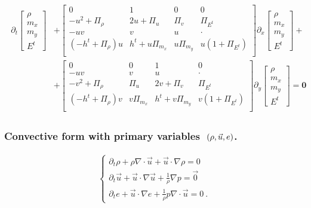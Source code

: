 \documentclass[letterpaper,10pt,english]{jupyterBook}
\begin{document}
\begin{equation}\label{equation:ch/pde/hyperbolic-nd-euler:eq:pde:hyperbolic:differential:convective:euler:cons-vars:mat}
\begin{split}\begin{aligned}
  \partial_t \begin{bmatrix} \rho \\ m_x \\ m_y \\ E^t \end{bmatrix} 
 & + \begin{bmatrix}
  0 & 1  & 0 & 0 \\
  -u^2 + \Pi_{\rho} & 2 u + \Pi_u & \Pi_v & \Pi_{E^t}  \\
  -uv    & v & u & \cdot \\
  (-h^t + \Pi_\rho ) u & h^t + u \Pi_{m_x} & u \Pi_{m_y} & u ( 1 + \Pi_{E^t} ) \\
   \end{bmatrix} \partial_x \begin{bmatrix} \rho \\ m_x \\ m_y \\ E^t \end{bmatrix} + \\
 & + \begin{bmatrix}
  0 & 0 & 1 & 0 \\
  -uv    & v & u & \cdot \\
  -v^2 + \Pi_{\rho} & \Pi_u & 2 v + \Pi_v & \Pi_{E^t} \\
  ( -h^t + \Pi_\rho ) v & v \Pi_{m_x} & h^t + v \Pi_{m_y} & v ( 1 + \Pi_{E^t} ) \\
   \end{bmatrix} \partial_y \begin{bmatrix} \rho \\ m_x \\ m_y \\ E^t \end{bmatrix} = \mathbf{0}
\end{aligned}\end{split}
\end{equation}\subsubsection*{Convective form with primary variables \protect\(\ (\rho, \vec{u}, e)\protect\).}
\begin{equation}\label{equation:ch/pde/hyperbolic-nd-euler:eq:pde:hyperbolic:differential:convective:euler:rho-u-e}
\begin{split}\begin{cases}
  \partial_t \rho + \rho \nabla \cdot \vec{u} + \vec{u} \cdot \nabla \rho = 0 \\
  \partial_t \vec{u} + \vec{u} \cdot \nabla \vec{u} + \frac{1}{\rho} \nabla p = \vec{0} \\
  \partial_t e + \vec{u} \cdot \nabla e + \frac{1}{\rho} p \nabla \cdot \vec{u} = 0 \ .
\end{cases}\end{split}
\end{equation}
\end{document}
